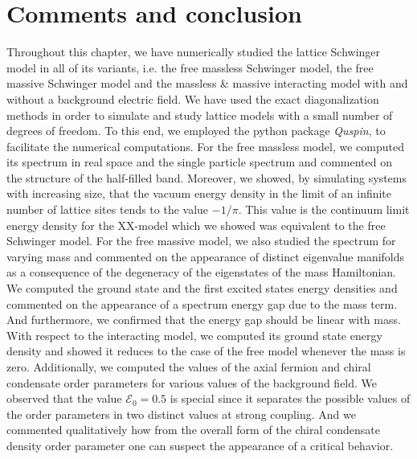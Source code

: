 \section{Comments and conclusion}

Throughout this chapter, we have numerically studied the lattice Schwinger model in all of its variants, i.e. the free massless Schwinger model, the free massive Schwinger model and the massless \& massive interacting model with and without a background electric field. We have used the exact diagonalization methods in order to simulate and study lattice models with a small number of degrees of freedom. To this end, we employed the python package \textit{Quspin}, to facilitate the numerical computations. For the free massless model, we computed its spectrum in real space and the single particle spectrum and commented on the structure of the half-filled band. Moreover, we showed, by simulating systems with increasing size, that the vacuum energy density in the limit of an infinite number of lattice sites tends to the value $-1/\pi$. This value is the continuum limit energy density for the XX-model which we showed was equivalent to the free Schwinger model. For the free massive model, we also studied the spectrum for varying mass and commented on the appearance of distinct eigenvalue manifolds as a consequence of the degeneracy of the eigenstates of the mass Hamiltonian. We computed the ground state and the first excited states energy densities and commented on the appearance of a spectrum energy gap due to the mass term. And furthermore, we confirmed that the energy gap should be linear with mass.\\

With respect to the interacting model, we computed its ground state energy density and showed it reduces to the case of the free model whenever the mass is zero. Additionally, we computed the values of the axial fermion and chiral condensate order parameters for various values of the background field. We observed that the value $\mathcal{E}_0=0.5$ is special since it separates the possible values of the order parameters in two distinct values at strong coupling. And we commented qualitatively how from the overall form of the chiral condensate density order parameter one can suspect the appearance of a critical behavior.\\

